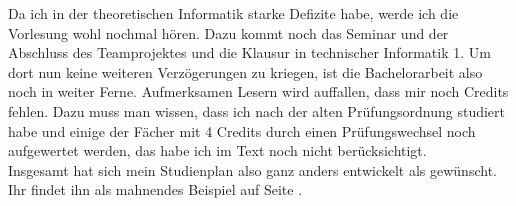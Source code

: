 Da ich in der theoretischen
 Informatik starke Defizite habe, werde ich die Vorlesung wohl nochmal
 hören. Dazu kommt noch das Seminar und der Abschluss des
 Teamprojektes und die Klausur in technischer Informatik 1. Um dort
 nun keine weiteren Verzögerungen zu kriegen, ist die Bachelorarbeit
 also noch in weiter Ferne. Aufmerksamen Lesern wird auffallen, dass
 mir noch Credits fehlen. Dazu muss man wissen, dass ich nach der
 alten Prüfungsordnung studiert habe und einige der Fächer mit 4
 Credits durch einen Prüfungswechsel noch aufgewertet werden, das habe
 ich im Text noch nicht berücksichtigt.\\
Insgesamt hat sich mein Studienplan also
 ganz anders entwickelt als gewünscht. Ihr findet ihn als mahnendes
 Beispiel auf Seite \pageref{studienplan_irre}.
